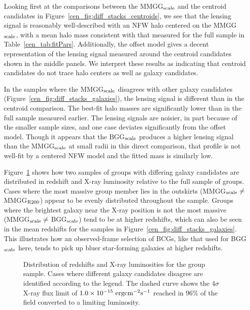 Looking first at the comparisons between the MMGG$_{\rm scale}$ and
the centroid candidates in Figure~\ref{cen_fig:diff_stacks_centroids}, we see that the lensing signal is
reasonably well-described with an NFW halo centered on the MMGG$_{\rm
  scale}$, with a mean halo mass consistent with that measured for
the full sample in Table~\ref{cen_tab:fitPars}. Additionally, the offset
model gives a decent representation of the lensing signal measured around
the centroid candidates shown in the middle panels. We interpret these
results as indicating that centroid candidates do not trace halo
centers as well as galaxy candidates.

In the samples where the MMGG$_{\rm scale}$ disagrees with other
galaxy candidates (Figure~\ref{cen_fig:diff_stacks_galaxies}), the lensing
signal is different than in the centroid
comparison. The best-fit halo masses are significantly
  lower than in the full sample measured earlier. The lensing signals
  are noisier, in part because of the smaller sample sizes, and one
  case deviates significantly from the offset model.  Though it appears
that the BGG$_{\rm scale}$ produces a higher lensing signal than the
MMGG$_{\rm scale}$ at small radii in this direct comparison, that
profile is not well-fit by a centered NFW model and the fitted mass is
similarly low.

Figure~\ref{cen_fig:bad_groups} shows how two samples of groups with
differing galaxy candidates are distributed in redshift and X-ray
luminosity relative to the full sample of groups. Cases where the
most massive group member lies in the outskirts (MMGG$_{\rm scale}
\ne$ MMGG$_{\rm R200}$) appear to be evenly distributed throughout the
sample. Groups where the brightest galaxy near the X-ray position is
not the most massive (MMGG$_{\rm scale} \ne$ BGG$_{\rm scale}$) tend
to be at higher redshifts, which can also be seen in the mean
redshifts for the samples in
Figure~\ref{cen_fig:diff_stacks_galaxies}. This illustrates how an
observed-frame 
selection of BCGs, like that used for BGG$_{\rm scale}$ here, tends to
pick up bluer star-forming galaxies at higher redshifts.

\begin{figure}[htb]
\caption{Distribution of redshifts and X-ray luminosities for the
  group sample. Cases where different galaxy candidates disagree are
  identified according to the legend. The dashed curve shows the
  $4\sigma$ X-ray flux limit of $1.0\times10^{-15}~\rm{erg cm^{-2}
    s^{-1}}$ reached in $96\%$ of the field converted to a limiting
  luminosity.}
\label{cen_fig:bad_groups}
\end{figure}


